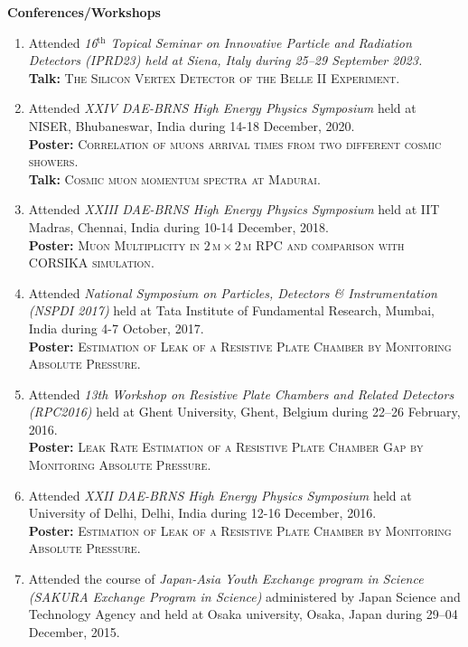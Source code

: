 \documentclass[12pt]{article}
\begin{document}
\colorbox{gray!40}{\begin{minipage}{16.2cm}
\bf {Conferences/Workshops} 
\end{minipage} }
\begin{minipage}{1.0\textwidth}
 \vspace{0.4cm}
\begin{enumerate}
  
\item Attended \emph{16$^{\text{th}}$ Topical Seminar on Innovative Particle and Radiation Detectors (IPRD23) held at Siena, Italy during 25--29 September 2023.} \\
  {\bf{Talk:}} \textsc{The Silicon Vertex Detector of the Belle II Experiment}.

\item Attended \emph{XXIV DAE-BRNS High Energy Physics Symposium}  held at NISER, Bhubaneswar, India during 14-18 December, 2020. \\
  {\bf{Poster:}} \textsc{Correlation of muons arrival times from two different cosmic showers}.\\
  {\bf{Talk:}} \textsc{Cosmic muon momentum spectra at Madurai}.

\item Attended \emph{XXIII DAE-BRNS High Energy Physics Symposium}  held at IIT Madras, Chennai, India during 10-14 December, 2018. \\
  {\bf{Poster:}} \textsc{Muon Multiplicity in $2$\,m\,$\times$\,2\,m RPC and comparison with CORSIKA simulation}.

\item Attended \emph{National Symposium on Particles, Detectors \& Instrumentation (NSPDI 2017)} held at Tata Institute of Fundamental Research, Mumbai,  India during 4-7 October, 2017. \\
  {\bf{Poster:}} \textsc{Estimation of Leak of a Resistive Plate Chamber by Monitoring Absolute Pressure}.

\item Attended \emph{13th Workshop on Resistive Plate Chambers and
Related Detectors (RPC2016)} held at Ghent University, Ghent,
  Belgium during 22--26 February, 2016.\\
  {\bf{Poster:}} \textsc{Leak Rate Estimation of a Resistive Plate Chamber Gap by Monitoring Absolute Pressure}.
  
\item Attended \emph{XXII DAE-BRNS High Energy Physics Symposium}  held at University of Delhi, Delhi, India during 12-16 December, 2016. \\
  {\bf{Poster:}} \textsc{Estimation of Leak of a Resistive Plate Chamber by Monitoring Absolute Pressure}.
  
\item Attended the course of \emph{Japan-Asia Youth Exchange program in Science (SAKURA Exchange Program in Science)} administered by Japan Science and Technology Agency and held at Osaka university, Osaka, Japan during 29--04 December, 2015. 



  
  

\end{enumerate}
\end{minipage}
\end{document}
